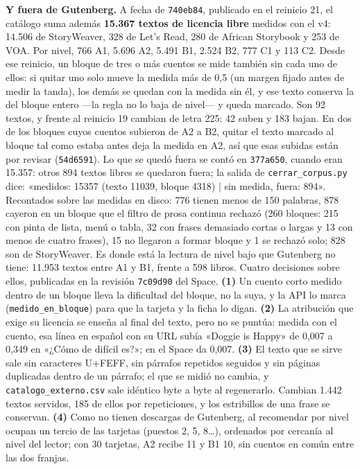 \documentclass[11pt,a4paper]{article}
\newcommand{\cod}[1]{\texttt{\small #1}}
\begin{document}
\textbf{Y fuera de Gutenberg.} A fecha de \cod{740eb84}, publicado en el reinicio 21, el catálogo suma además \textbf{15.367 textos de licencia libre} medidos con el v4: 14.506 de StoryWeaver, 328 de Let's Read, 280 de African Storybook y 253 de VOA. Por nivel, 766 A1, 5.696 A2, 5.491 B1, 2.524 B2, 777 C1 y 113 C2. Desde ese reinicio, un bloque de tres o más cuentos se mide también sin cada uno de ellos: si quitar uno solo mueve la medida más de 0,5 (un margen fijado antes de medir la tanda), los demás se quedan con la medida sin él, y ese texto conserva la del bloque entero ---la regla no lo baja de nivel--- y queda marcado. Son 92 textos, y frente al reinicio 19 cambian de letra 225: 42 suben y 183 bajan. En dos de los bloques cuyos cuentos subieron de A2 a B2, quitar el texto marcado al bloque tal como estaba antes deja la medida en A2, así que esas subidas están por revisar (\cod{54d6591}). Lo que se quedó fuera se contó en \cod{377a650}, cuando eran 15.357: otros 894 textos libres se quedaron fuera; la salida de \cod{cerrar\_corpus.py} dice: «medidos: 15357 (texto 11039, bloque 4318) | sin medida, fuera: 894». Recontados sobre las medidas en disco: 776 tienen menos de 150 palabras, 878 cayeron en un bloque que el filtro de prosa continua rechazó (260 bloques: 215 con pinta de lista, menú o tabla, 32 con frases demasiado cortas o largas y 13 con menos de cuatro frases), 15 no llegaron a formar bloque y 1 se rechazó solo; 828 son de StoryWeaver. Es donde está la lectura de nivel bajo que Gutenberg no tiene: 11.953 textos entre A1 y B1, frente a 598 libros. Cuatro decisiones sobre ellos, publicadas en la revisión \cod{7c09d90} del Space. \textbf{(1)} Un cuento corto medido dentro de un bloque lleva la dificultad del bloque, no la suya, y la API lo marca (\cod{medido\_en\_bloque}) para que la tarjeta y la ficha lo digan. \textbf{(2)} La atribución que exige su licencia se enseña al final del texto, pero no se puntúa: medida con el cuento, esa línea en español con su URL subía «Doggie is Happy» de 0,007 a 0,349 en «¿Cómo de difícil es?»; en el Space da 0,007. \textbf{(3)} El texto que se sirve sale sin caracteres U+FEFF, sin párrafos repetidos seguidos y sin páginas duplicadas dentro de un párrafo; el que se midió no cambia, y \cod{catalogo\_externo.csv} sale idéntico byte a byte al regenerarlo. Cambian 1.442 textos servidos, 185 de ellos por repeticiones, y los estribillos de una frase se conservan. \textbf{(4)} Como no tienen descargas de Gutenberg, al recomendar por nivel ocupan un tercio de las tarjetas (puestos 2, 5, 8\ldots), ordenados por cercanía al nivel del lector; con 30 tarjetas, A2 recibe 11 y B1 10, sin cuentos en común entre las dos franjas.
\end{document}
